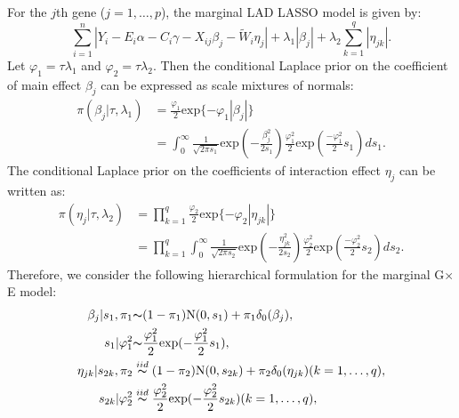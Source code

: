 \documentclass[12pt]{article}
\begin{document}
For the $j$th gene ($j=1,\dots,p$), the marginal LAD LASSO model is given by: %
\begin{equation*}
 \sum_{i=1}^{n}|Y_{i}-E_{i}\alpha - C_{i}\gamma - X_{ij}\beta_{j} - \tilde{W}_{i}\eta_{j}|+\lambda_1|\beta_{j}|+\lambda_2 \sum_{k=1}^{q}|\eta_{jk}|.
\end{equation*}
Let $\varphi_{1}=\tau\lambda_1$ and $\varphi_{2}=\tau\lambda_2$. Then the conditional Laplace prior on the coefficient of main effect $\beta_{j}$ can be expressed as scale mixtures of normals:
\begin{equation*}
\begin{aligned}
\pi(\beta_{j}|\tau, \lambda_1) &= \frac{\varphi_1}{2}\text{exp}\{-\varphi_1|\beta_{j}|\}\\
&=\int_0^{\infty}\frac{1}{\sqrt{2\pi s_1}}\text{exp}(-\frac{\beta_{j}^2}{2 s_1})\frac{\varphi_1^2}{2}\text{exp}(\frac{-\varphi_1^2}{2}s_1)d s_1.
\end{aligned}
\end{equation*}
 The conditional Laplace prior on the coefficients of interaction effect $\eta_{j}$ can be written as:
\begin{equation*}
\begin{aligned}
\pi(\eta_{j}|\tau, \lambda_2) &= \prod_{k=1}^{q}\frac{\varphi_2}{2}\text{exp}\{-\varphi_2|\eta_{jk}|\}\\
&=\prod_{k=1}^{q}\int_0^{\infty}\frac{1}{\sqrt{2\pi s_2}}\text{exp}(-\frac{\eta_{jk}^2}{2 s_2})\frac{\varphi_2^2}{2}\text{exp}(\frac{-\varphi_2^2}{2}s_2)d s_2.
\end{aligned}
\end{equation*}
Therefore, we consider the following hierarchical formulation for the marginal G$\times$E model:
\begin{equation}\label{equr:ge2}
\begin{aligned}
\beta_j|s_1, \pi_1 &{\thicksim} (1-\pi_1)\text{N}(0, s_1)+\pi_1 \delta_{0}(\beta_j),\\
s_{1}|{\varphi_{1}^{2}}&{\thicksim}\frac{\varphi_{1}^{2}}{2}\text{exp}({-\frac{\varphi_{1}^{2}}{2}}s_{1}),\\
\eta_{jk}|s_{2k}, \pi_2 &\stackrel{iid}{\thicksim} (1-\pi_2)\text{N}(0, s_{2k})+\pi_2 \delta_{0}(\eta_{jk})(k=1,\dots, q), \\
s_{2k}|{\varphi_{2}^{2}}& \stackrel{iid}{\thicksim}\frac{\varphi_{2}^{2}}{2}\text{exp}({-\frac{\varphi_{2}^{2}}{2}}s_{2k})(k=1,\dots, q),\\
\end{aligned}
\end{equation}
\end{document}
